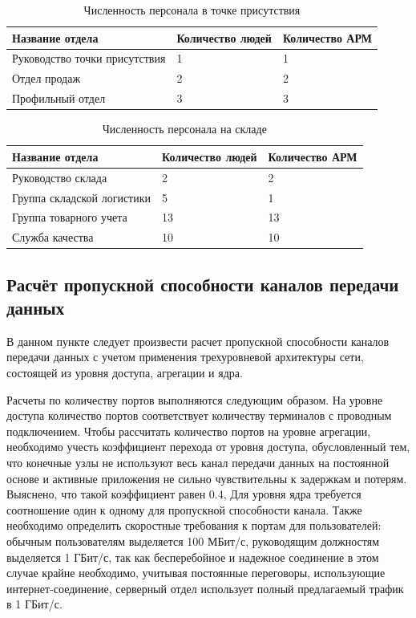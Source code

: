 \documentclass[14pt, a4paper]{extarticle}
\numberwithin{equation}{section}
\begin{document}
\begin{table}[H]
\centering
\small
\caption{Численность персонала в точке присутствия}
\begin{tabular}{|m{5cm}|m{3cm}|m{3cm}|}
\hline
\textbf{Название отдела} & \textbf{Количество людей} & \textbf{Количество АРМ} \\
\hline
Руководство точки присутствия & 1 & 1 \\
\hline
Отдел продаж & 2 & 2 \\
\hline
Профильный отдел & 3 & 3 \\
\hline
\end{tabular}
\label{table:tpPopul}
\end{table}


\begin{table}[H]
\centering
\small
\caption{Численность персонала на складе}
\begin{tabular}{|m{4cm}|m{3cm}|m{3cm}|}
\hline
\textbf{Название отдела} & \textbf{Количество людей} & \textbf{Количество АРМ} \\
\hline
Руководство склада & 2 & 2 \\
\hline
Группа складской логистики & 5 & 1 \\
\hline
Группа товарного учета & 13 & 13 \\
\hline
Служба качества & 10 & 10 \\
\hline
\end{tabular}
\label{table:warehousePopul}
\end{table}


\subsection{Расчёт пропускной способности каналов передачи данных}
В данном пункте следует произвести расчет пропускной способности каналов передачи 
данных с учетом применения трехуровневой архитектуры сети, состоящей 
из уровня доступа, агрегации и ядра. 

Расчеты по количеству портов выполняются следующим образом.
На уровне доступа количество портов соответствует количеству терминалов 
с проводным подключением. 
Чтобы рассчитать количество портов на уровне агрегации, необходимо 
учесть коэффициент перехода от уровня доступа, обусловленный тем, 
что конечные узлы не используют весь канал передачи данных на 
постоянной основе и активные приложения не сильно 
чувствительны к задержкам и потерям. Выяснено, что такой коэффициент равен 0.4,
Для уровня ядра требуется соотношение один к одному для пропускной способности канала.
Также необходимо определить скоростные требования
к портам для пользователей: обычным пользователям выделяется 
100 МБит/с, руководящим должностям выделяется 1 ГБит/с, так как 
бесперебойное и надежное соединение в 
этом случае крайне необходимо, учитывая постоянные 
переговоры, использующие интернет-соединение, серверный отдел 
использует полный предлагаемый трафик в 1 ГБит/с. 
\end{document}
